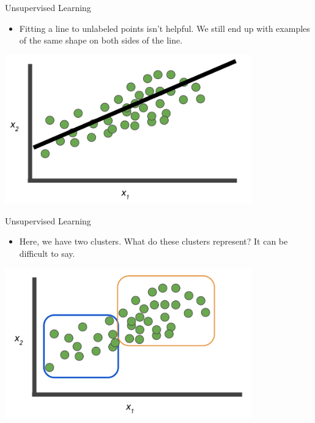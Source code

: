 \documentclass{beamer}
\begin{document}
\begin{frame}{Unsupervised Learning}

\begin{itemize}
\item Fitting a line to unlabeled points isn't helpful. We still end up with examples of the same shape on both sides of the line. 
\end{itemize}

\includegraphics[width=0.8\textwidth]{images/Graph5.png}

\end{frame}


\begin{frame}{Unsupervised Learning}

\begin{itemize}
\item Here, we have two clusters. What do these clusters represent? It can be difficult to say. 

\end{itemize}

\includegraphics[width=0.8\textwidth]{images/Graph6.png}

\end{frame}

\end{document}
